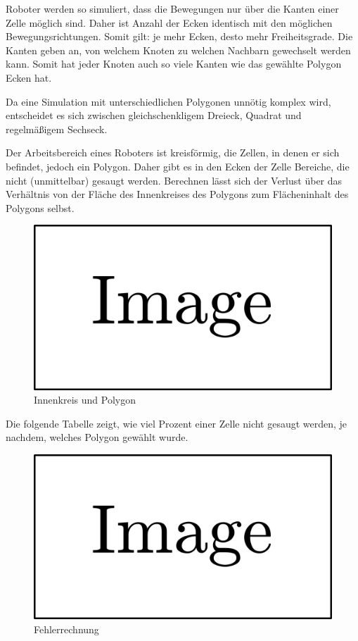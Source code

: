 \documentclass{article}
\begin{document}
Roboter werden so simuliert, dass die Bewegungen nur über die Kanten einer
Zelle möglich sind. Daher ist Anzahl der Ecken identisch mit den möglichen
Bewegungsrichtungen. Somit gilt: je mehr Ecken, desto mehr Freiheitsgrade.
Die Kanten geben an, von welchem Knoten zu welchen Nachbarn gewechselt werden
kann. Somit hat jeder Knoten auch so viele Kanten wie das gewählte Polygon
Ecken hat.

Da eine Simulation mit unterschiedlichen Polygonen unnötig komplex
wird, entscheidet es sich zwischen gleichschenkligem Dreieck, 
Quadrat und regelmäßigem Sechseck.

Der Arbeitsbereich eines Roboters ist kreisförmig, die Zellen, in denen er
sich befindet, jedoch ein Polygon. Daher gibt es in den Ecken der Zelle 
Bereiche, die nicht (unmittelbar) gesaugt werden. Berechnen lässt 
sich der Verlust über das Verhältnis von der Fläche des Innenkreises 
des Polygons zum Flächeninhalt des Polygons selbst. 

\begin{figure}
\includegraphics{img/dummy.png}
\caption{Innenkreis und Polygon}
\label{img:floor_quotient_circle_polygon}
\end{figure}

Die folgende Tabelle zeigt, wie viel Prozent einer Zelle nicht gesaugt werden,
je nachdem, welches Polygon gewählt wurde.

\begin{figure}
\includegraphics{img/dummy.png}
\caption{Fehlerrechnung}
\label{img:floor_error_circle_polygon}
\end{figure}
\end{document}
